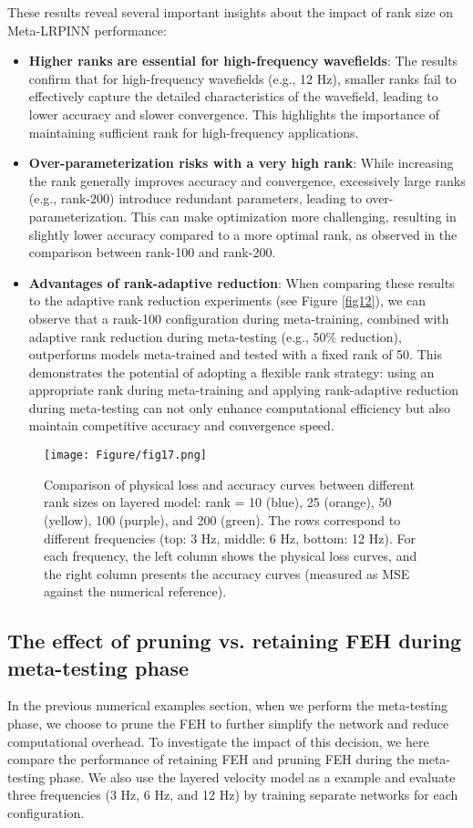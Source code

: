 These results reveal several important insights about the impact of rank size on Meta-LRPINN performance:
\begin{itemize}
    \item \textbf{Higher ranks are essential for high-frequency wavefields}: The results confirm that for high-frequency wavefields (e.g., 12 Hz), smaller ranks fail to effectively capture the detailed characteristics of the wavefield, leading to lower accuracy and slower convergence. This highlights the importance of maintaining sufficient rank for high-frequency applications.
    \item \textbf{Over-parameterization risks with a very high rank}: While increasing the rank generally improves accuracy and convergence, excessively large ranks (e.g., rank-200) introduce redundant parameters, leading to over-parameterization. This can make optimization more challenging, resulting in slightly lower accuracy compared to a more optimal rank, as observed in the comparison between rank-100 and rank-200.
    \item \textbf{Advantages of rank-adaptive reduction}: When comparing these results to the adaptive rank reduction experiments (see Figure \ref{fig12}), we can observe that a rank-100 configuration during meta-training, combined with adaptive rank reduction during meta-testing (e.g., 50\% reduction), outperforms models meta-trained and tested with a fixed rank of 50. This demonstrates the potential of adopting a flexible rank strategy: using an appropriate rank during meta-training and applying rank-adaptive reduction during meta-testing can not only enhance computational efficiency but also maintain competitive accuracy and convergence speed.
\end{itemize}




\begin{figure}[htbp]
\centering
\texttt{[image: Figure/fig17.png]}
\caption{Comparison of physical loss and accuracy curves between different rank sizes on layered model: rank = 10 (blue), 25 (orange), 50 (yellow), 100 (purple), and 200 (green). The rows correspond to different frequencies (top: 3 Hz, middle: 6 Hz, bottom: 12 Hz). For each frequency, the left column shows the physical loss curves, and the right column presents the accuracy curves (measured as MSE against the numerical reference).}
\label{fig17}
\end{figure}


\subsection{The effect of pruning vs. retaining FEH during meta-testing phase}
In the previous numerical examples section, when we perform the meta-testing phase, we choose to prune the FEH to further simplify the network and reduce computational overhead. To investigate the impact of this decision, we here compare the performance of retaining FEH and pruning FEH during the meta-testing phase. We also use the layered velocity model as a example and evaluate three frequencies (3 Hz, 6 Hz, and 12 Hz) by training separate networks for each configuration. 

